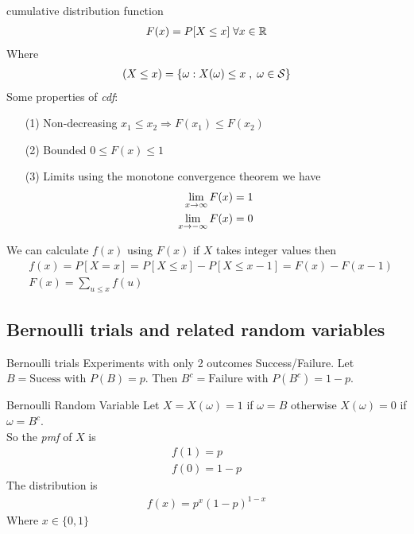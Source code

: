 \documentclass[16pt,a4paper]{article}
\begin{document}
\newpage
\begin{defn}{cumulative distribution function}
    \begin{align*}
        F(x) = P[X\leq x] \; \forall x \in \mathbb{R}
    \end{align*}
    Where 
    \begin{align*}
        (X\leq x) = \{\omega : X(\omega) \leq x \; ,\; \omega \in \cal S\}
    \end{align*}
    Some properties of \textit{cdf}:
    \begin{enumerate}
        \item[(1)] Non-decreasing $x_1 \leq x_2 \Rightarrow F(x_1) \leq F(x_2)$
        \item[(2)] Bounded $0\leq F(x) \leq 1$
        \item[(3)] Limits using the monotone convergence theorem we have 
            \begin{align*}
                \lim\limits_{x \rightarrow \infty} F(x) = 1\\
                \lim\limits_{x \rightarrow -\infty} F(x) = 0
            \end{align*}
    \end{enumerate}
\end{defn}
We can calculate $f(x)$ using $F(x)$ if $X$ takes integer values then 
\begin{align*}
    &f(x) = P[X=x] = P[X\leq x]-P[X\leq x-1] = F(x) - F(x-1)\\
    &F(x) = \sum_{u\leq x}f(u)
\end{align*} 
\newpage
\subsection{Bernoulli trials and related random variables}
\begin{defn}{Bernoulli trials}
    Experiments with only 2 outcomes Success/Failure. 
    Let $B = \text{Sucess}$ with $P(B) = p$. Then $B^c = \text{Failure}$ with $P(B^c) = 1-p$. 
\end{defn}
\begin{defn}{Bernoulli Random Variable}
    Let $X = X(\omega) = 1$ if $\omega = B$ otherwise $X(\omega) = 0$ if $\omega = B^c$. 
    \\
    So the \textit{pmf} of $X$ is 
    \begin{align*}
        f(1) = p\\
        f(0) = 1-p
    \end{align*}
    The distribution is 
    \begin{align*}
        f(x) = p^x(1-p)^{1-x}
    \end{align*}
    Where $x\in \{0,1\}$
\end{defn}
\end{document}
